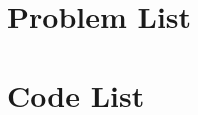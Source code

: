 \documentclass[10pt,titlepage]{ctexart}
\begin{document}

\maketitle


\tableofcontents
\newpage



\begin{appendices}
\section{Problem List}\label{app:problemlist}


\section{Code List}\label{app:codelist}

\end{appendices}

\end{document}

